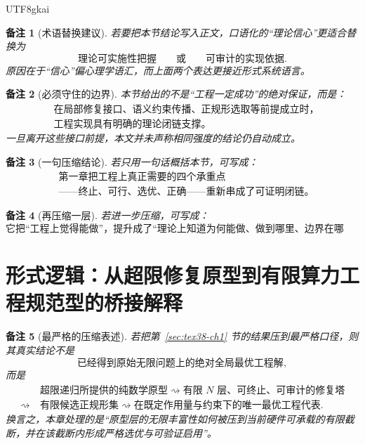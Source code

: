 \documentclass[12pt]{article}
\newtheorem{remark}{备注}[section]
\begin{document}
\begin{CJK*}{UTF8}{gkai}
\begin{remark}[术语替换建议]
若要把本节结论写入正文，口语化的“理论信心”更适合替换为
\[
  \text{理论可实施性把握}
  \qquad\text{或}\qquad
  \text{可审计的实现依据}.
\]
原因在于“信心”偏心理学语汇，而上面两个表达更接近形式系统语言。
\end{remark}

\begin{remark}[必须守住的边界]
本节给出的不是“工程一定成功”的绝对保证，而是：
\[
  \begin{aligned}
    &\text{在局部修复接口、语义约束传播、正规形选取等前提成立时，}\\
    &\text{工程实现具有明确的理论闭链支撑。}
  \end{aligned}
\]
一旦离开这些接口前提，本文并未声称相同强度的结论仍自动成立。
\end{remark}

\begin{remark}[一句压缩结论]
若只用一句话概括本节，可写成：
\[
  \begin{aligned}
    &\text{第一章把工程上真正需要的四个承重点}\\
    &\text{——终止、可行、选优、正确——重新串成了可证明闭链。}
  \end{aligned}
\]
\end{remark}

\begin{remark}[再压缩一层]
若进一步压缩，可写成：
\[
  \text{它把“工程上觉得能做”，提升成了“理论上知道为何能做、做到哪里、边界在哪里”。}
\]
\end{remark}

\clearpage

\section{形式逻辑：从超限修复原型到有限算力工程规范型的桥接解释}
\label{sec:tex38-ch3}

\begin{remark}[最严格的压缩表述]
若把第~\ref{sec:tex38-ch1} 节的结果压到最严格口径，则其真实结论不是
\[
  \text{已经得到原始无限问题上的绝对全局最优工程解},
\]
而是
\[
  \begin{aligned}
    &\text{超限递归所提供的纯数学原型}
    \rightsquigarrow
    \text{有限 $N$ 层、可终止、可审计的修复塔}\\
    \rightsquigarrow\ &
    \text{有限候选正规形集}
    \rightsquigarrow
    \text{在既定作用量与约束下的唯一最优工程代表}.
  \end{aligned}
\]
换言之，本章处理的是“原型层的无限丰富性如何被压到当前硬件可承载的有限截断，并在该截断内形成严格选优与可验证启用”。
\end{remark}


\end{CJK*}
\end{document}
